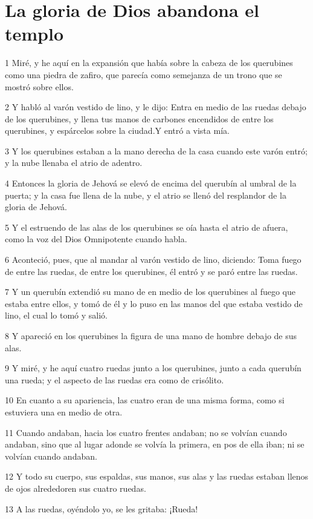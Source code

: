 \section*{La gloria de Dios abandona el templo}

\par 1 Miré, y he aquí en la expansión que había sobre la cabeza de los querubines como una piedra de zafiro, que parecía como semejanza de un trono que se mostró sobre ellos. 
\par 2 Y habló al varón vestido de lino, y le dijo: Entra en medio de las ruedas debajo de los querubines, y llena tus manos de carbones encendidos de entre los querubines, y espárcelos sobre la ciudad.Y entró a vista mía.
\par 3 Y los querubines estaban a la mano derecha de la casa cuando este varón entró; y la nube llenaba el atrio de adentro.
\par 4 Entonces la gloria de Jehová se elevó de encima del querubín al umbral de la puerta; y la casa fue llena de la nube, y el atrio se llenó del resplandor de la gloria de Jehová.
\par 5 Y el estruendo de las alas de los querubines se oía hasta el atrio de afuera, como la voz del Dios Omnipotente cuando habla.
\par 6 Aconteció, pues, que al mandar al varón vestido de lino, diciendo: Toma fuego de entre las ruedas, de entre los querubines, él entró y se paró entre las ruedas.
\par 7 Y un querubín extendió su mano de en medio de los querubines al fuego que estaba entre ellos, y tomó de él y lo puso en las manos del que estaba vestido de lino, el cual lo tomó y salió.
\par 8 Y apareció en los querubines la figura de una mano de hombre debajo de sus alas.
\par 9 Y miré, y he aquí cuatro ruedas junto a los querubines, junto a cada querubín una rueda; y el aspecto de las ruedas era como de crisólito.
\par 10 En cuanto a su apariencia, las cuatro eran de una misma forma, como si estuviera una en medio de otra.
\par 11 Cuando andaban, hacia los cuatro frentes andaban; no se volvían cuando andaban, sino que al lugar adonde se volvía la primera, en pos de ella iban; ni se volvían cuando andaban.
\par 12 Y todo su cuerpo, sus espaldas, sus manos, sus alas y las ruedas estaban llenos de ojos alrededoren sus cuatro ruedas.
\par 13 A las ruedas, oyéndolo yo, se les gritaba: ¡Rueda! 
